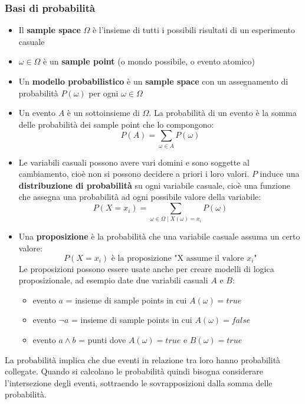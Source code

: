 \documentclass[a4paper]{article}
\begin{document}
\subsubsection{Basi di probabilità}
\begin{itemize}
  \item Il \textbf{sample space} \( \Omega  \) è l'insieme di tutti i possibili risultati
    di un esperimento casuale

  \item \( \omega \in \Omega \) è un \textbf{sample point} (o mondo possibile, o evento atomico)

  \item Un \textbf{modello probabilistico} è un \textbf{sample space} con un assegnamento
    di probabilità \( P(\omega) \) per ogni \( \omega \in \Omega  \)

  \item Un evento \( A \) è un sottoinsieme di \( \Omega  \). La probabilità di un evento
    è la somma delle probabilità dei sample point che lo compongono:
    \[
      P(A) = \sum_{\omega \in A} P(\omega)
    \]

  \item Le variabili casuali possono avere vari domini e sono soggette al cambiamento,
    cioè non si possono decidere a priori i loro valori. \( P \) induce una \textbf{distribuzione
    di probabilità} su ogni variabile casuale, cioè una funzione che assegna una probabilità
    ad ogni possibile valore della variabile:
    \[
      P(X = x_i) = \sum_{\omega \in \Omega \;|\; X(\omega) = x_i} P(\omega)
    \] 

  \item Una \textbf{proposizione} è la probabilità che una variabile casuale assuma
    un certo valore:
    \[
      P(X = x_i) \text{ è la proposizione "X assume il valore } x_i \text{"}
    \]
    Le proposizioni possono essere usate anche per creare modelli di logica proposizionale,
    ad esempio date due variabili casuali \( A \) e \( B \):
    \begin{itemize}
      \item evento \( a \) = insieme di sample points in cui \( A(\omega) = true \)
      \item evento \( \neg a \) = insieme di sample points in cui \( A(\omega) = false \)
      \item evento \( a \wedge b \) = punti dove \( A(\omega) = true \) e \( B(\omega) = true \)
    \end{itemize}
\end{itemize}
La probabilità implica che due eventi in relazione tra loro hanno probabilità 
collegate. Quando si calcolano le probabilità quindi bisogna considerare l'intersezione
degli eventi, sottraendo le sovrapposizioni dalla somma delle probabilità.
\end{document}
